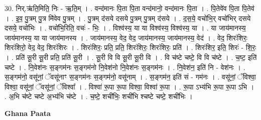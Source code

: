 \documentclass[17pt]{extarticle}
\begin{document}
30. निर्.ऋ॑ति॒मिति॒ निः - ऋ॒ति॒म् । . वन्द॑मानः पि॒ता पि॒ता वन्द॑मानो॒ वन्द॑मानः पि॒ता । . पि॒तेवे॑व पि॒ता पि॒तेव॑ । . इ॒व॒ पु॒त्रम् पु॒त्र मि॑वेव पु॒त्रम् । . पु॒त्रम् द॑सये दसये पु॒त्रम् पु॒त्रम् द॑सये । . द॒स॒ये॒ वचो॑भि॒र् वचो॑भिर् दसये दसये॒ वचो॑भिः । . वचो॑भि॒रिति॒ वचः॑ - भिः॒ । . विश्व॑स्य॒ या या विश्व॑स्य॒ विश्व॑स्य॒ या । . या जाय॑मानस्य॒ जाय॑मानस्य॒ या या जाय॑मानस्य । . जाय॑मानस्य॒ वेद॒ वेद॒ जाय॑मानस्य॒ जाय॑मानस्य॒ वेद॑ । . वेद॒ शिरः॑शिरः॒ शिरः॑शिरो॒ वेद॒ वेद॒ शिरः॑शिरः । . शिरः॑शिरः॒ प्रति॒ प्रति॒ शिरः॑शिरः॒ शिरः॑शिरः॒ प्रति॑ । . शिरः॑शिर॒ इति॒ शिरः॑ - शि॒रः॒ । . प्रति॑ सू॒री सू॒री प्रति॒ प्रति॑ सू॒री । . सू॒री वि वि सू॒री सू॒री वि । . वि च॑ष्टे चष्टे॒ वि वि च॑ष्टे । . च॒ष्ट॒ इति॑ चष्टे । . नि॒वेश॑नः स॒ङ्गम॑नः स॒ङ्गम॑नो नि॒वेश॑नो नि॒वेश॑नः स॒ङ्गम॑नः । . नि॒वेश॑न॒ इति॑ नि - वेश॑नः । . स॒ङ्गम॑नो॒ वसू॑नां॒ ॅवसू॑नाꣳ स॒ङ्गम॑नः स॒ङ्गम॑नो॒ वसू॑नाम् । . स॒ङ्गम॑न॒ इति॑ सं - गम॑नः । . वसू॑नां॒ ॅविश्वा॒ विश्वा॒ वसू॑नां॒ ॅवसू॑नां॒ ॅविश्वा᳚ । . विश्वा॑ रू॒पा रू॒पा विश्वा॒ विश्वा॑ रू॒पा । . रू॒पा ऽभ्य॑भि रू॒पा रू॒पा ऽभि । . अ॒भि च॑ष्टे चष्टे अ॒भ्य॑भि च॑ष्टे । . च॒ष्टे॒ शची॑भिः॒ शची॑भि श्चष्टे चष्टे॒ शची॑भिः । \newline

\textbf{Ghana Paata } \newline
\end{document}
